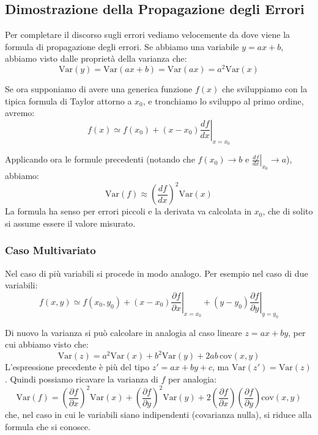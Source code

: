 \documentclass[openany,a4paper,12pt]{book}
\theoremstyle{remark}
\begin{document}
\subsection{Dimostrazione della Propagazione degli Errori}

Per completare il discorso sugli errori vediamo velocemente da dove viene la formula di propagazione degli errori.
Se abbiamo una variabile $y = ax + b$, abbiamo visto dalle proprietà della varianza che:
\begin{equation*}
\text{Var}(y) = \text{Var}(ax+b) = \text{Var}(ax) = a^2 \text{Var}(x)
\end{equation*}

Se ora supponiamo di avere una generica funzione $f(x)$ che sviluppiamo con la tipica formula di Taylor attorno a $x_0$, e tronchiamo lo sviluppo al primo ordine, avremo:
\begin{equation}
f(x) \simeq f(x_0) + (x - x_0) \left. \frac{df}{dx} \right|_{x=x_0}
\end{equation}

Applicando ora le formule precedenti (notando che $f(x_0) \to b$ e $\left.\frac{df}{dx}\right|_{x_0} \to a$), abbiamo:
\begin{equation}
\text{Var}(f) \approx \left( \frac{df}{dx} \right)^2 \text{Var}(x)
\end{equation}
La formula ha senso per errori piccoli e la derivata va calcolata in $x_0$, che di solito si assume essere il valore misurato.

\subsubsection*{Caso Multivariato}
Nel caso di più variabili si procede in modo analogo. Per esempio nel caso di due variabili:
\begin{equation*}
f(x,y) \simeq f(x_0, y_0) + (x - x_0)\left.\frac{\partial f}{\partial x}\right|_{x=x_0} + (y - y_0)\left.\frac{\partial f}{\partial y}\right|_{y=y_0}
\end{equation*}

Di nuovo la varianza si può calcolare in analogia al caso lineare $z = ax + by$, per cui abbiamo visto che:
\begin{equation*}
\text{Var}(z) = a^2\text{Var}(x) + b^2\text{Var}(y) + 2ab \, \text{cov}(x,y)
\end{equation*}
L'espressione precedente è più del tipo $z' = ax + by + c$, ma $\text{Var}(z') = \text{Var}(z)$. Quindi possiamo ricavare la varianza di $f$ per analogia:
\begin{equation}
\text{Var}(f) = \left( \frac{\partial f}{\partial x} \right)^2 \text{Var}(x) + \left( \frac{\partial f}{\partial y} \right)^2 \text{Var}(y) + 2 \left(\frac{\partial f}{\partial x}\right) \left(\frac{\partial f}{\partial y}\right) \text{cov}(x,y)
\end{equation}
che, nel caso in cui le variabili siano indipendenti (covarianza nulla), si riduce alla formula che si conosce.
\end{document}
